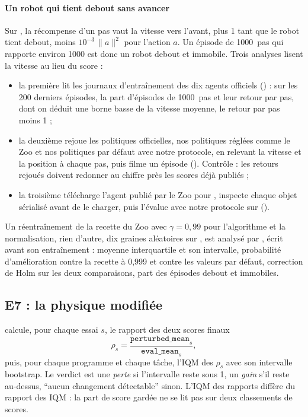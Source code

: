 \paragraph{Un robot qui tient debout sans avancer}
Sur , la récompense d'un pas vaut la vitesse vers l'avant, plus 1 tant que le robot tient debout,
moins $10^{-3}\,\lVert a\rVert^2$ pour l'action $a$. Un épisode de \num{1000}~pas qui rapporte environ
\num{1000} est donc un robot debout et immobile. Trois analyses lisent la vitesse au lieu du score :
\begin{itemize}
  \item la première lit les journaux d'entraînement des dix agents officiels () :
    sur les 200 derniers épisodes, la part d'épisodes de \num{1000}~pas et leur retour par pas, dont on déduit
    une borne basse de la vitesse moyenne, le retour par pas moins 1 ;
  \item la deuxième rejoue les politiques officielles, nos politiques réglées comme le Zoo et nos politiques
    par défaut avec notre protocole, en relevant la vitesse et la position à chaque pas, puis filme un épisode
    (). Contrôle : les retours rejoués doivent redonner au chiffre près les
    scores déjà publiés ;
  \item la troisième télécharge l'agent publié par le Zoo pour , inspecte chaque
    objet sérialisé avant de le charger, puis l'évalue avec notre protocole sur 
    ().
\end{itemize}
Un réentraînement de la recette du Zoo avec $\gamma=0{,}99$ pour l'algorithme et la normalisation, rien
d'autre, dix graines aléatoires sur , est analysé par ,
écrit avant son entraînement : moyenne interquartile et son intervalle, probabilité d'amélioration contre
la recette à 0,999 et contre les valeurs par défaut, correction de Holm sur les deux comparaisons, part des
épisodes debout et immobiles.

\subsection{E7 : la physique modifiée}\label{sec:plan-e7}
 calcule, pour chaque essai $s$, le rapport des deux scores finaux
\begin{equation}\label{eq:e7}
  \rho_s=\frac{\texttt{perturbed\_mean}_s}{\texttt{eval\_mean}_s},
\end{equation}
puis, pour chaque programme et chaque tâche, l'IQM des $\rho_s$
avec son intervalle bootstrap. Le verdict est une \emph{perte} si l'intervalle reste sous 1, un \emph{gain}
s'il reste au-dessus, \enquote{aucun changement détectable} sinon. L'IQM des rapports diffère du rapport
des IQM : la part de score gardée ne se lit pas sur deux classements de scores.

